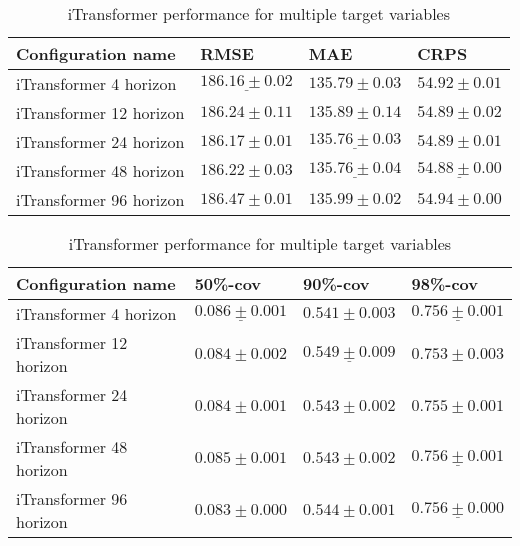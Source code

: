 \documentclass[class=scrbook, crop=false]{standalone}
\begin{document}
 \begin{table}[]
\centering
\begin{tabular}{l|l|l|l}
 Configuration name			&  RMSE 			& MAE 			& CRPS 	\\\hline
 iTransformer 4 horizon		& $\underline{186.16 \pm 0.02}	$&$ 135.79 \pm 0.03	$&$54.92 \pm 0.01$\\
 iTransformer 12 horizon		&$ 186.24\pm 0.11	$&$135.89 \pm 0.14	$&$54.89 \pm 0.02$ \\
 iTransformer 24 horizon		&$ 186.17	\pm 0.01	$&$ \underline{135.76 \pm 0.03}	$&$54.89	\pm 0.01$\\
 iTransformer 48 horizon		&$ 186.22  \pm 0.03	$&$\underline{ 135.76 \pm 0.04	}$&$\underline{54.88	\pm 0.00}$ \\
 iTransformer 96 horizon		&$ 186.47	\pm 0.01	$&$ 135.99 \pm 0.02	$&$54.94	\pm 0.00$\\
\end{tabular}
\caption{iTransformer performance for multiple target variables}
\label{Table::Performance_targets_horizon}
\end{table}
\begin{table}
\centering
\begin{tabular}{l|l|l|l}
 Configuration name			&   50\%-cov 		& 90\%-cov 		& 98\%-cov \\\hline
 iTransformer 4 horizon		&$\underline{0.086 \pm 0.001}	$&$ 0.541\pm 0.003 	$&$\underline{0.756 \pm 0.001}$\\
 iTransformer 12 horizon		&$0.084\pm 0.002	$&$ \underline{0.549\pm 0.009}	$ &$ 0.753 \pm 0.003$ \\
 iTransformer 24 horizon		&$0.084\pm 0.001	$&$0.543\pm 0.002	 $&$0.755 \pm 0.001$\\
 iTransformer 48 horizon		&$0.085\pm 0.001	$&$ 0.543\pm 0.002	 $&$\underline{ 0.756\pm 0.001}$ \\
 iTransformer 96 horizon		&$0.083\pm 0.000	$&$ 0.544\pm 0.001	 $&$ \underline{0.756 \pm 0.000}$\\
\end{tabular}
\caption{iTransformer performance for multiple target variables}
\label{Table::Performance_targets_horizon2}
\end{table}

\end{document}
